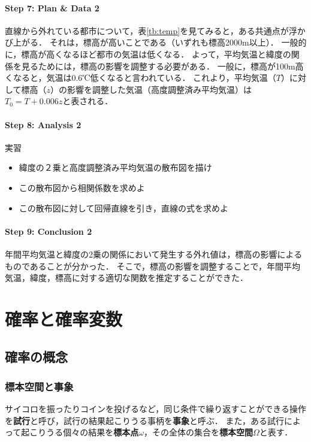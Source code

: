 \subsubsection*{Step 7: Plan \& Data 2}
%
直線から外れている都市について，表\ref{tb:temp}を見てみると，ある共通点が浮かび上がる．
%
それは，標高が高いことである（いずれも標高2000m以上）．
%
一般的に，標高が高くなるほど都市の気温は低くなる．
%
よって，平均気温と緯度の関係を見るためには，標高の影響を調整する必要がある．
%
一般に，標高が100m高くなると，気温は0.6℃低くなると言われている．
%
これより，平均気温（$ T $）に対して標高（$ z $）の影響を調整した気温（高度調整済み平均気温）は$ T_{0}=T+0.006z $と表される．
%

\subsubsection*{Step 8: Analysis 2}

%
\begin{itembox}[l]{実習}
%
\begin{itemize}
\item
緯度の２乗と高度調整済み平均気温の散布図を描け
\item
この散布図から相関係数を求めよ
\item
この散布図に対して回帰直線を引き，直線の式を求めよ
\end{itemize}
%
\end{itembox}
%

\subsubsection*{Step 9: Conclusion 2}
%
年間平均気温と緯度の2乗の関係において発生する外れ値は，標高の影響によるものであることが分かった．
%
そこで，標高の影響を調整することで，年間平均気温，緯度，標高に対する適切な関数を推定することができた．
%


\chapter{確率と確率変数}

\section{確率の概念}

\subsection{標本空間と事象}
%
サイコロを振ったりコインを投げるなど，同じ条件で繰り返すことができる操作を\textbf{試行}と呼び，試行の結果起こりうる事柄を\textbf{事象}と呼ぶ．
%
また，ある試行によって起こりうる個々の結果を\textbf{標本点}$ \omega $，その全体の集合を\textbf{標本空間}$ \Omega $と表す．
%
%

